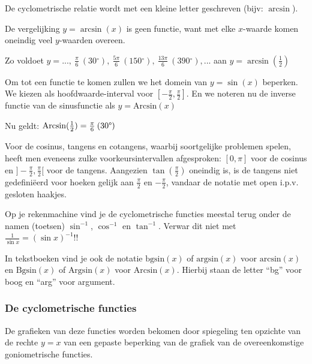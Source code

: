 De cyclometrische relatie wordt met een kleine letter geschreven
(bijv: $\arcsin$).




De vergelijking $y=\arcsin(x)$ is geen functie, want met
elke $x$-waarde komen oneindig veel $y$-waarden overeen. 


Zo voldoet $y=...,\:\frac{\pi}{6}\:(30{^\circ}),\:\frac{5\pi}{6}\:(150{^\circ}),\:\frac{13\pi}{6}\:(390{^\circ}),...$
aan $y=\arcsin(\frac{1}{2})$

Om tot een functie te komen zullen we het domein van $y=\sin(x)$
beperken. We kiezen als hoofdwaarde-interval voor $[-\frac{\pi}{2},\frac{\pi}{2}]$.
En we noteren nu de inverse functie van de sinusfunctie als $y=\textrm{Arcsin}(x)$

Nu geldt: $\textrm{Arcsin}(\frac{1}{2})=\frac{\pi}{6}\:(30\text{\textdegree})$

Voor de cosinus, tangens en cotangens, waarbij soortgelijke problemen
spelen, heeft men eveneens zulke voorkeursintervallen afgesproken:
$[0,\pi]$ voor de cosinus en $]-\frac{\pi}{2},\frac{\pi}{2}[$ voor
de tangens. Aangezien $\tan(\frac{\pi}{2})$ oneindig is, is de tangens
niet gedefini\"eerd voor hoeken gelijk aan $\frac{\pi}{2}$ en $-\frac{\pi}{2}$,
vandaar de notatie met open i.p.v. gesloten haakjes.


\begin{opmerking}
	Op je rekenmachine vind je de cyclometrische
functies meestal terug onder de namen (toetsen) $\sin^{-1}$,
$\cos^{-1}$ en $\tan^{-1}$. Verwar
dit niet met $\frac{1}{\sin x}=\left(\sin x\right)^{-1}$!!

In tekstboeken vind je ook de notatie $\textrm{bgsin}(x)$
of $\textrm{argsin}(x)$ voor $\textrm{arcsin}(x)$ en $\textrm{Bgsin}(x)$
of $\textrm{Argsin}(x)$ voor $\textrm{Arcsin}(x)$. Hierbij staan
de letter ``bg'' voor boog en ``arg'' voor argument.
\end{opmerking}


\subsubsection{De cyclometrische functies}

De grafieken van deze functies worden bekomen door spiegeling ten
opzichte van de rechte $y=x$ van een gepaste beperking van de grafiek
van de overeenkomstige goniometrische functies.

